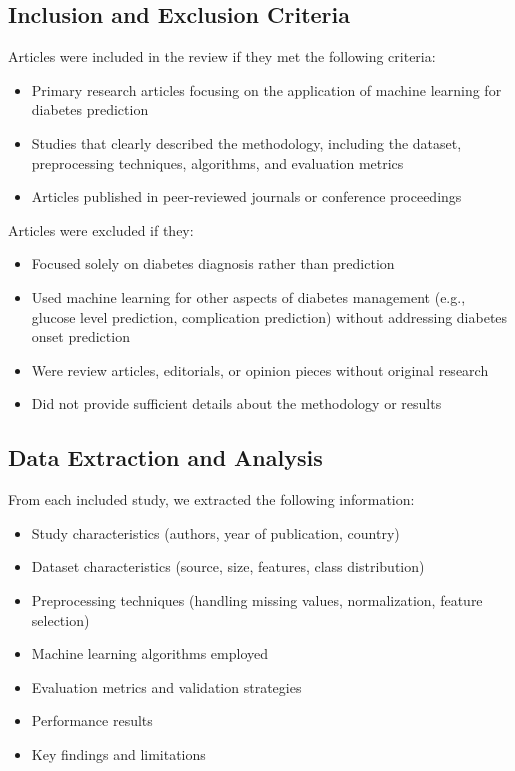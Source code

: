 \documentclass[journal]{IEEEtran}
\begin{document}
\subsection{Inclusion and Exclusion Criteria}
Articles were included in the review if they met the following criteria:
\begin{itemize}
    \item Primary research articles focusing on the application of machine learning for diabetes prediction
    \item Studies that clearly described the methodology, including the dataset, preprocessing techniques, algorithms, and evaluation metrics
    \item Articles published in peer-reviewed journals or conference proceedings
\end{itemize}

Articles were excluded if they:
\begin{itemize}
    \item Focused solely on diabetes diagnosis rather than prediction
    \item Used machine learning for other aspects of diabetes management (e.g., glucose level prediction, complication prediction) without addressing diabetes onset prediction
    \item Were review articles, editorials, or opinion pieces without original research
    \item Did not provide sufficient details about the methodology or results
\end{itemize}

\subsection{Data Extraction and Analysis}
From each included study, we extracted the following information:
\begin{itemize}
    \item Study characteristics (authors, year of publication, country)
    \item Dataset characteristics (source, size, features, class distribution)
    \item Preprocessing techniques (handling missing values, normalization, feature selection)
    \item Machine learning algorithms employed
    \item Evaluation metrics and validation strategies
    \item Performance results
    \item Key findings and limitations
\end{itemize}
\end{document}
